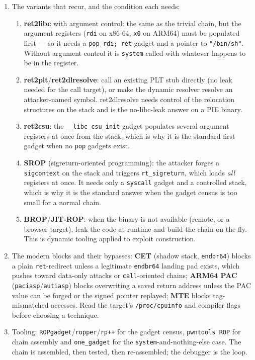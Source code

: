 \documentclass[12pt]{Training}
\begin{document}
\begin{enumerate}
    \item The variants that recur, and the condition each needs:
    \begin{enumerate}
        \item \textbf{ret2libc} with argument control: the same as the trivial chain, but the argument registers (\lstinline{rdi} on x86-64, \lstinline{x0} on ARM64) must be populated first --- so it needs a \lstinline{pop rdi; ret} gadget and a pointer to \lstinline{"/bin/sh"}. Without argument control it is \lstinline{system} called with whatever happens to be in the register.
        \item \textbf{ret2plt}/\textbf{ret2dlresolve}: call an existing PLT stub directly (no leak needed for the call target), or make the dynamic resolver resolve an attacker-named symbol. ret2dlresolve needs control of the relocation structures on the stack and is the no-libc-leak answer on a PIE binary.
        \item \textbf{ret2csu}: the \lstinline{__libc_csu_init} gadget populates several argument registers at once from the stack, which is why it is the standard first gadget when no \lstinline{pop} gadgets exist.
        \item \textbf{SROP} (sigreturn-oriented programming): the attacker forges a \lstinline{sigcontext} on the stack and triggers \lstinline{rt_sigreturn}, which loads \emph{all} registers at once. It needs only a \lstinline{syscall} gadget and a controlled stack, which is why it is the standard answer when the gadget census is too small for a normal chain.
        \item \textbf{BROP}/\textbf{JIT-ROP}: when the binary is not available (remote, or a browser target), leak the code at runtime and build the chain on the fly. This is dynamic tooling applied to exploit construction.
    \end{enumerate}
    \item The modern blocks and their bypasses: \textbf{CET} (shadow stack, \lstinline{endbr64}) blocks a plain \lstinline{ret}-redirect unless a legitimate \lstinline{endbr64} landing pad exists, which pushes toward data-only attacks or \lstinline{call}-oriented chains; \textbf{ARM64 PAC} (\lstinline{paciasp}/\lstinline{autiasp}) blocks overwriting a saved return address unless the PAC value can be forged or the signed pointer replayed; \textbf{MTE} blocks tag-mismatched accesses. Read the target's \lstinline{/proc/cpuinfo} and compiler flags before choosing a technique.
    \item Tooling: \lstinline{ROPgadget}/\lstinline{ropper}/\lstinline{rp++} for the gadget census, \lstinline{pwntools ROP} for chain assembly and \lstinline{one_gadget} for the \lstinline{system}-and-nothing-else case. The chain is assembled, then tested, then re-assembled; the debugger is the loop.
\end{enumerate}
\end{document}

